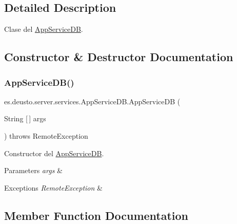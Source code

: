 \subsection{Detailed Description}
Clase del \mbox{\hyperlink{classes_1_1deusto_1_1server_1_1services_1_1_app_service_d_b}{App\+Service\+DB}}. 

\subsection{Constructor \& Destructor Documentation}
\mbox{\label{classes_1_1deusto_1_1server_1_1services_1_1_app_service_d_b_a409668aba7daa8751863e3cf0fd4b809}} 
\subsubsection{\texorpdfstring{AppServiceDB()}{AppServiceDB()}}
{\footnotesize\ttfamily es.\+deusto.\+server.\+services.\+App\+Service\+D\+B.\+App\+Service\+DB (\begin{DoxyParamCaption}\item[{String \mbox{[}$\,$\mbox{]}}]{args }\end{DoxyParamCaption}) throws Remote\+Exception}

Constructor del \mbox{\hyperlink{classes_1_1deusto_1_1server_1_1services_1_1_app_service_d_b}{App\+Service\+DB}}. 
\begin{DoxyParams}{Parameters}
{\em args} & \\
\hline
\end{DoxyParams}

\begin{DoxyExceptions}{Exceptions}
{\em Remote\+Exception} & \\
\hline
\end{DoxyExceptions}


\subsection{Member Function Documentation}
\mbox{\label{classes_1_1deusto_1_1server_1_1services_1_1_app_service_d_b_ad5abb10d1ef40b2ec6a00db392bce459}} 
